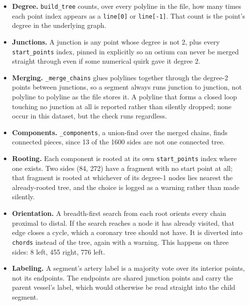 \begin{itemize}
  \item \textbf{Degree.} \texttt{build\_tree} counts, over every polyline in the file, how many
  times each point index appears as a \texttt{line[0]} or \texttt{line[-1]}. That count is the
  point's degree in the underlying graph.

  \item \textbf{Junctions.} A junction is any point whose degree is not 2, plus every
  \texttt{start\_points} index, pinned in explicitly so an ostium can never be merged straight
  through even if some numerical quirk gave it degree 2.

  \item \textbf{Merging.} \texttt{\_merge\_chains} glues polylines together through the degree-2
  points between junctions, so a segment always runs junction to junction, not polyline to
  polyline as the file stores it. A polyline that forms a closed loop touching no junction at all
  is reported rather than silently dropped; none occur in this dataset, but the check runs
  regardless.

  \item \textbf{Components.} \texttt{\_components}, a union-find over the merged chains, finds
  connected pieces, since 13 of the 1600 sides are not one connected tree.

  \item \textbf{Rooting.} Each component is rooted at its own \texttt{start\_points} index where
  one exists. Two sides (84, 272) have a fragment with no start point at all; that fragment is
  rooted at whichever of its degree-1 nodes lies nearest the already-rooted tree, and the choice
  is logged as a warning rather than made silently.

  \item \textbf{Orientation.} A breadth-first search from each root orients every chain proximal
  to distal. If the search reaches a node it has already visited, that edge closes a cycle, which
  a coronary tree should not have. It is diverted into \texttt{chords} instead of the tree, again
  with a warning. This happens on three sides: 8 left, 455 right, 776 left.

  \item \textbf{Labeling.} A segment's artery label is a majority vote over its interior points,
  not its endpoints. The endpoints are shared junction points and carry the parent vessel's
  label, which would otherwise be read straight into the child segment.


\end{itemize}

